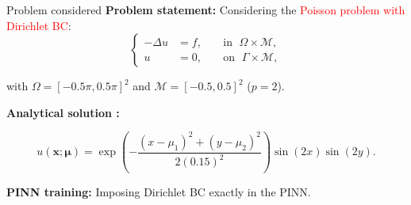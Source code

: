\begin{frame}{Problem considered} 
	\textbf{Problem statement:} Considering the \textcolor{red}{Poisson problem with Dirichlet BC}:
	\vspace{-5pt}
	\begin{equation*}
		\left\{
		\begin{aligned}
			-\Delta u & = f, \; &  & \text{in } \; \Omega \times \mathcal{M}, \\
			u         & = 0, \;  &  & \text{on } \; \Gamma \times \mathcal{M},
		\end{aligned}
		\right.
	\end{equation*}

	with $\Omega=[-0.5\pi,0.5\pi]^2$ and $\mathcal{M}=[-0.5,0.5]^2$ ($p=2$).
	
	\vspace{2pt}
	\textbf{Analytical solution :}

	\vspace{-12pt}
	\begin{equation*}
		u(\bm{x};\bm{\mu})= \exp\left(-\frac{(x-\mu_1)^2+(y-\mu_2)^2}{2(0.15)^2}\right)\sin(2x)\sin(2y).
	\end{equation*}

	\vspace{2pt}
	\small
	\textbf{PINN training:} Imposing Dirichlet BC exactly in the PINN.

	\vspace{8pt}
\end{frame}


